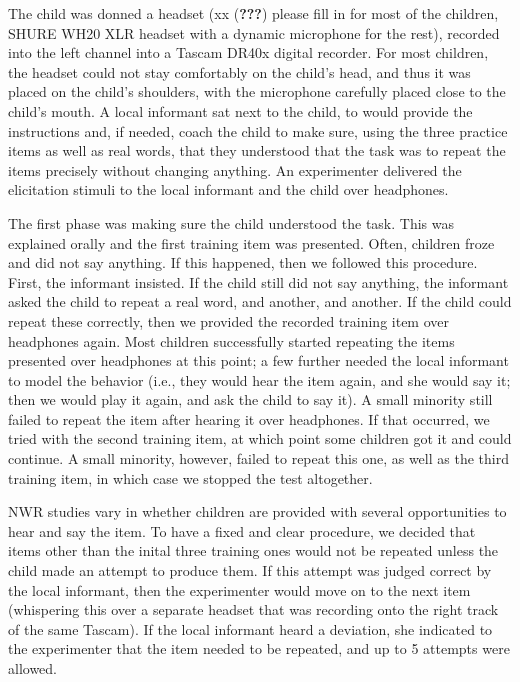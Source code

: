\documentclass[english,,man,floatsintext]{apa6}
\begin{document}
The child was donned a headset (xx ({\textbf{???}}) please fill in for most of the children, SHURE WH20 XLR headset with a dynamic microphone for the rest), recorded into the left channel into a Tascam DR40x digital recorder. For most children, the headset could not stay comfortably on the child's head, and thus it was placed on the child's shoulders, with the microphone carefully placed close to the child's mouth. A local informant sat next to the child, to would provide the instructions and, if needed, coach the child to make sure, using the three practice items as well as real words, that they understood that the task was to repeat the items precisely without changing anything. An experimenter delivered the elicitation stimuli to the local informant and the child over headphones.

The first phase was making sure the child understood the task. This was explained orally and the first training item was presented. Often, children froze and did not say anything. If this happened, then we followed this procedure. First, the informant insisted. If the child still did not say anything, the informant asked the child to repeat a real word, and another, and another. If the child could repeat these correctly, then we provided the recorded training item over headphones again. Most children successfully started repeating the items presented over headphones at this point; a few further needed the local informant to model the behavior (i.e., they would hear the item again, and she would say it; then we would play it again, and ask the child to say it). A small minority still failed to repeat the item after hearing it over headphones. If that occurred, we tried with the second training item, at which point some children got it and could continue. A small minority, however, failed to repeat this one, as well as the third training item, in which case we stopped the test altogether.

NWR studies vary in whether children are provided with several opportunities to hear and say the item. To have a fixed and clear procedure, we decided that items other than the inital three training ones would not be repeated unless the child made an attempt to produce them. If this attempt was judged correct by the local informant, then the experimenter would move on to the next item (whispering this over a separate headset that was recording onto the right track of the same Tascam). If the local informant heard a deviation, she indicated to the experimenter that the item needed to be repeated, and up to 5 attempts were allowed.
\end{document}
